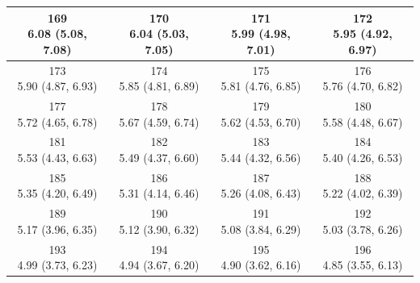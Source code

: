 \begin{table}[htbp]
\begin{tabular}{cccc}
\hline
\shortstack[c]{169\\6.08 (5.08, 7.08)} & \shortstack[c]{170\\6.04 (5.03, 7.05)} & \shortstack[c]{171\\5.99 (4.98, 7.01)} & \shortstack[c]{172\\5.95 (4.92, 6.97)} \\
\hline
\shortstack[c]{173\\5.90 (4.87, 6.93)} & \shortstack[c]{174\\5.85 (4.81, 6.89)} & \shortstack[c]{175\\5.81 (4.76, 6.85)} & \shortstack[c]{176\\5.76 (4.70, 6.82)} \\
\hline
\shortstack[c]{177\\5.72 (4.65, 6.78)} & \shortstack[c]{178\\5.67 (4.59, 6.74)} & \shortstack[c]{179\\5.62 (4.53, 6.70)} & \shortstack[c]{180\\5.58 (4.48, 6.67)} \\
\hline
\shortstack[c]{181\\5.53 (4.43, 6.63)} & \shortstack[c]{182\\5.49 (4.37, 6.60)} & \shortstack[c]{183\\5.44 (4.32, 6.56)} & \shortstack[c]{184\\5.40 (4.26, 6.53)} \\
\hline
\shortstack[c]{185\\5.35 (4.20, 6.49)} & \shortstack[c]{186\\5.31 (4.14, 6.46)} & \shortstack[c]{187\\5.26 (4.08, 6.43)} & \shortstack[c]{188\\5.22 (4.02, 6.39)} \\
\hline
\shortstack[c]{189\\5.17 (3.96, 6.35)} & \shortstack[c]{190\\5.12 (3.90, 6.32)} & \shortstack[c]{191\\5.08 (3.84, 6.29)} & \shortstack[c]{192\\5.03 (3.78, 6.26)} \\
\hline
\shortstack[c]{193\\4.99 (3.73, 6.23)} & \shortstack[c]{194\\4.94 (3.67, 6.20)} & \shortstack[c]{195\\4.90 (3.62, 6.16)} & \shortstack[c]{196\\4.85 (3.55, 6.13)} \\

\end{tabular}
\end{table}

